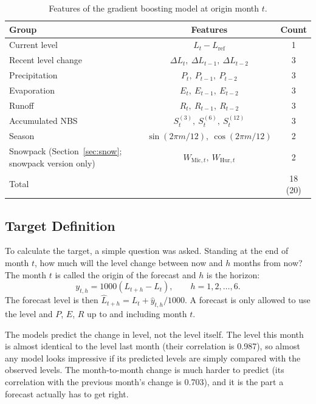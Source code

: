 \documentclass{article}
\begin{document}
\begin{table}[htbp]
\centering
\caption{Features of the gradient boosting model at origin month $t$.}
\label{tab:features}
\begin{tabular}{||l|c|c||}
\hline\hline
Group & Features & Count \\
\hline\hline
Current level & $L_t - L_{\mathrm{ref}}$ & 1 \\
Recent level change & $\Delta L_t,\ \Delta L_{t-1},\ \Delta L_{t-2}$ & 3 \\
Precipitation & $P_t,\ P_{t-1},\ P_{t-2}$ & 3 \\
Evaporation & $E_t,\ E_{t-1},\ E_{t-2}$ & 3 \\
Runoff & $R_t,\ R_{t-1},\ R_{t-2}$ & 3 \\
Accumulated NBS & $S^{(3)}_t,\ S^{(6)}_t,\ S^{(12)}_t$ & 3 \\
Season & $\sin(2\pi m/12),\ \cos(2\pi m/12)$ & 2 \\
Snowpack (Section~\ref{sec:snow}; snowpack version only) & $W_{\mathrm{Mic},t},\ W_{\mathrm{Hur},t}$ & 2 \\
\hline\hline
Total & & 18 (20) \\
\hline\hline
\end{tabular}
\end{table}

\subsection{Target Definition}

To calculate the target, a simple question was asked. Standing at the end of month $t$, how much
will the level change between now and $h$ months from now? The month $t$ is called the origin of
the forecast and $h$ is the horizon:
\begin{equation}
y_{t,h} = 1000\left(L_{t+h} - L_t\right), \qquad h = 1, 2, \dots, 6. \label{eq:target}
\end{equation}
The forecast level is then $\hat L_{t+h} = L_t + \hat y_{t,h}/1000$. A forecast is only allowed
to use the level and $P$, $E$, $R$ up to and including month $t$.

The models predict the change in level, not the level itself. The level this month is almost
identical to the level last month (their correlation is 0.987), so almost any model looks
impressive if its predicted levels are simply compared with the observed levels. The
month-to-month change is much harder to predict (its correlation with the previous month's
change is 0.703), and it is the part a forecast actually has to get right.
\end{document}
